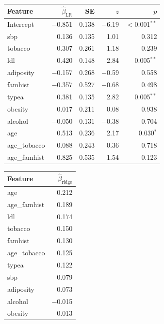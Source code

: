 \documentclass[12pt,a4paper]{article}
\begin{document}
\noindent
\begin{minipage}[t]{0.55\linewidth}
\captionsetup{width=\linewidth}
\label{tab:inference}
\vspace{1pt}
{\scriptsize
\renewcommand{\arraystretch}{0.85}
\begin{tabular}{@{}lrrrr@{}}
\toprule
Feature & $\hat{\beta}_{\text{LR}}$ & SE & $z$ & $p$ \\
\midrule
Intercept    & $-$0.851 & 0.138 & $-$6.19 & $<$0.001$^{**}$ \\
sbp          &    0.136 & 0.135 &    1.01 & 0.312 \\
tobacco      &    0.307 & 0.261 &    1.18 & 0.239 \\
ldl          &    0.420 & 0.148 &    2.84 & 0.005$^{**}$ \\
adiposity    & $-$0.157 & 0.268 & $-$0.59 & 0.558 \\
famhist      & $-$0.357 & 0.527 & $-$0.68 & 0.498 \\
typea        &    0.381 & 0.135 &    2.82 & 0.005$^{**}$ \\
obesity      &    0.017 & 0.211 &    0.08 & 0.938 \\
alcohol      & $-$0.050 & 0.131 & $-$0.38 & 0.704 \\
age          &    0.513 & 0.236 &    2.17 & 0.030$^{*}$ \\
age\_tobacco &    0.088 & 0.243 &    0.36 & 0.718 \\
age\_famhist &    0.825 & 0.535 &    1.54 & 0.123 \\
\bottomrule
\end{tabular}}
\end{minipage}\hfill
\begin{minipage}[t]{0.42\linewidth}
\captionsetup{width=\linewidth}
\label{tab:coef}
\vspace{1pt}
{\scriptsize
\renewcommand{\arraystretch}{0.85}
\begin{tabular}{@{}lr@{}}
\toprule
Feature & $\hat{\beta}_{\text{ridge}}$ \\
\midrule
age          &  0.212 \\
age\_famhist &  0.189 \\
ldl          &  0.174 \\
tobacco      &  0.150 \\
famhist      &  0.130 \\
age\_tobacco &  0.125 \\
typea        &  0.122 \\
sbp          &  0.079 \\
adiposity    &  0.073 \\
alcohol      & $-$0.015 \\
obesity      &  0.013 \\
\bottomrule
\end{tabular}}
\end{minipage}
\end{document}
